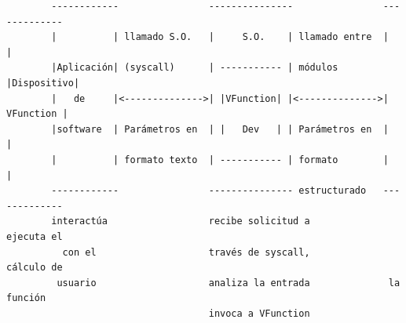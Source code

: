 \documentclass[12pt,letterpaper]{article}
\begin{document}
\begin{verbatim}
        ------------                ---------------                -------------
        |          | llamado S.O.   |     S.O.    | llamado entre  |           |
        |Aplicación| (syscall)      | ----------- | módulos        |Dispositivo|
        |   de     |<-------------->| |VFunction| |<-------------->| VFunction |
        |software  | Parámetros en  | |   Dev   | | Parámetros en  |           |
        |          | formato texto  | ----------- | formato        |           |
        ------------                --------------- estructurado   -------------
        interactúa                  recibe solicitud a              ejecuta el 
          con el                    través de syscall,              cálculo de 
         usuario                    analiza la entrada              la función
                                    invoca a VFunction
 \end{verbatim}
\end{document}

